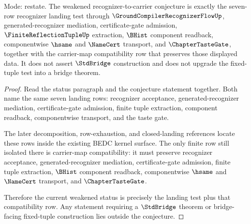 \begin{theorem}
\label{thm:finite-bhist-injection-status-tightening}
Mode: restate. The weakened recognizer-to-carrier conjecture is exactly the seven-row recognizer landing test through $\GroundCompilerRecognizerFlowUp$, generated-recognizer mediation, certificate-gate admission, $\FiniteReflectionTupleUp$ extraction, $\BHist$ component readback, componentwise $\hsame$ and $\NameCert$ transport, and $\ChapterTasteGate$, together with the carrier-map compatibility row that preserves those displayed data. It does not assert $\StdBridge$ construction and does not upgrade the fixed-tuple test into a bridge theorem.
\end{theorem}
\begin{proof}
Read the status paragraph and the conjecture statement together. Both name the same seven landing rows: recognizer acceptance, generated-recognizer mediation, certificate-gate admission, finite tuple extraction, component readback, componentwise transport, and the taste gate.

The later decomposition, row-exhaustion, and closed-landing references locate these rows inside the existing BEDC kernel surface. The only finite row still isolated there is carrier-map compatibility: it must preserve recognizer acceptance, generated-recognizer mediation, certificate-gate admission, finite tuple extraction, $\BHist$ component readback, componentwise $\hsame$ and $\NameCert$ transport, and $\ChapterTasteGate$.

Therefore the current weakened status is precisely the landing test plus that compatibility row. Any statement requiring a $\StdBridge$ theorem or bridge-facing fixed-tuple construction lies outside the conjecture.
\end{proof}

